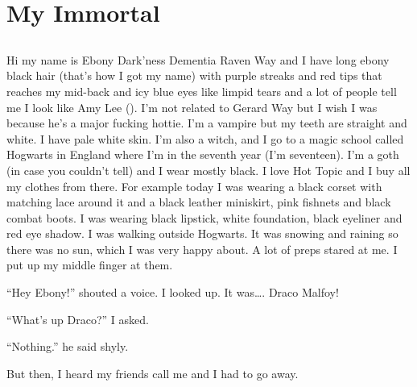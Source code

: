 \chapter{My Immortal}

\section{}


\XXX{\Xfill}

Hi my name is Ebony Dark'ness Dementia Raven Way and I have long ebony black hair (that's how I got my name) with purple streaks and red tips that reaches my mid-back and icy blue eyes like limpid tears and a lot of people tell me I look like Amy Lee (). I'm not related to Gerard Way but I wish I was because he's a major fucking hottie. I'm a vampire but my teeth are straight and white. I have pale white skin. I'm also a witch, and I go to a magic school called Hogwarts in England where I'm in the seventh year (I'm seventeen). I'm a goth (in case you couldn't tell) and I wear mostly black. I love Hot Topic and I buy all my clothes from there. For example today I was wearing a black corset with matching lace around it and a black leather miniskirt, pink fishnets and black combat boots. I was wearing black lipstick, white foundation, black eyeliner and red eye shadow. I was walking outside Hogwarts. It was snowing and raining so there was no sun, which I was very happy about. A lot of preps stared at me. I put up my middle finger at them.

\enquote{Hey Ebony!} shouted a voice. I looked up. It was…. Draco Malfoy!

\enquote{What's up Draco?} I asked.

\enquote{Nothing.} he said shyly.

But then, I heard my friends call me and I had to go away.

\XXX{\Xfill}


